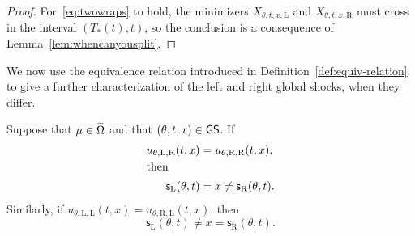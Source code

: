\documentclass[AHL,Unicode,longabstracts]{cedram}
\newcommand*\GS{\mathsf{GS}}
\newcommand*\sfs{\mathsf{s}}
\newcommand*\Left{\mathrm{L}}
\newcommand*\Right{\mathrm{R}}
\let\oldin\in
\renewcommand{\in}{\mathchoice{\oldin}{\oldin}{\,\oldin\,}{\,\oldin\,}}
\begin{document}
\begin{proof}
For~\eqref{eq:twowraps} to hold, the minimizers $X_{\theta,t,x,\Left}$ and $X_{\theta,t,x,\Right}$ must cross in the interval $(T_{*}(t),t)$, so the conclusion is a consequence of Lemma~\ref{lem:whencanyousplit}.
\end{proof}

We now use the equivalence relation introduced in Definition~\ref{def:equiv-relation} to give a further characterization of the left and right global shocks, when they differ.

\begin{prop}\label{prop:findleftrightshocks}
Suppose that $\mu\in\widetilde{\Omega}$ and that $(\theta,t,x)\in\GS$. If
\begin{align}
u_{\theta,\Left,\Right}(t,x) &=u_{\theta,\Right,\Right}(t,x),\nonumber
\\[-0.2em]
\intertext{then}
\sfs_{\Left}(\theta,t) &=x\ne\sfs_{\Right}(\theta,t).\label{eq:shocksdifferent-xleft}
\end{align}
Similarly, if $u_{\theta,\Left,\Left}(t,x)=u_{\theta,\Right,\Left}(t,x)$, then
\begin{equation}\label{eq:shocksdifferent-xright}
\sfs_{\Left}(\theta,t)\ne x=\sfs_{\Right}(\theta,t).
\end{equation}
\end{prop}
\end{document}
